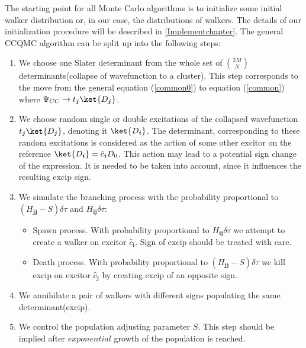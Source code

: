 \documentclass[twoside,english]{uiofysmaster}
\begin{document}
The starting point for all Monte Carlo algorithms is to initialize
some initial walker distribution or, in our case, the distributions of walkers.
The details of our initialization procedure will be described
in \autoref{Implementchapter}. The general CCQMC algorithm can be
split up into the following steps:

\begin{enumerate}
	\item  We choose one Slater determinant from the whole set of $\binom {2M}{N}$ determinants(collapse of wavefunction to a cluster). This step corresponds to the move from the general equation (\ref{common0}) to equation (\ref{common}) where $\Psi_{CC} \rightarrow t_{\boldsymbol{j}}\ket{D_{\boldsymbol{j}}}$.
	
	\item We choose random single or double excitations of the collapsed wavefunction $t_{\boldsymbol{j}}\ket{D_{\boldsymbol{j}}}$, denoting it $\ket{D_{\boldsymbol{i}}}$.
	The determinant, corresponding to these random excitations is considered as the action of some other excitor on the reference $\ket{D_{\boldsymbol{i}}} = \hat{c}_{\boldsymbol{i}}D_0$. This action may lead to a potential sign change of the expression. It is needed to be taken into account, since it influences the resulting excip sign.
	\item We simulate the branching process with the probability proportional to $(H_{\boldsymbol{j}\boldsymbol{j}} - S)\delta \tau$ and $H_{\boldsymbol{i}\boldsymbol{j}}\delta \tau$:
	\begin{itemize}
		\item Spawn process. With probability proportional to $H_{\boldsymbol{i}\boldsymbol{j}}\delta \tau$ we attempt to create a walker on excitor $\hat{c}_{\boldsymbol{i}}$. Sign of excip should be treated with care. 
		\item Death process. With probability proportional to $(H_{\boldsymbol{j}\boldsymbol{j}} - S)\delta \tau$ we kill excip on excitor $\hat{c}_{\boldsymbol{j}}$ by creating excip of an opposite sign.
	\end{itemize}
	
	\item We annihilate a pair of walkers with different signs populating the same determinant(excip).
	
	\item We control the population adjusting parameter $S$. This step should be implied after $exponential$ growth of the population is reached.
	

\end{enumerate}
\end{document}

